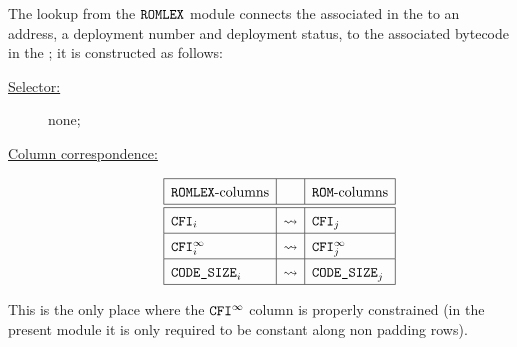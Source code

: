 The lookup from the $\texttt{ROMLEX}$ module connects the \CFI{} associated in the \romLexMod{} to an address, a deployment number and deployment status, to the associated bytecode in the \romMod{}; it is constructed as follows:
\begin{description}
	\item[\underline{Selector:}] none;
	\item[\underline{Column correspondence:}]
		\[
			\renewcommand{\arraystretch}{1.5}
			\begin{array}{|l|c|l|}
				\hline
				\text{\romLexMod{}-columns} &                  & \text{\romMod{}-columns} \\ \hline\hline
				\cfi      _{i}              & \rightsquigarrow & \cfi      _{j}           \\ \hline
				\cfiMax   _{i}              & \rightsquigarrow & \cfiMax   _{j}           \\ \hline
				\codeSize _{i}              & \rightsquigarrow & \codeSize _{j}           \\ \hline
			\end{array}
		\]
\end{description}
\saNote{} This is the only place where the $\texttt{CFI}^\infty{}$ column is properly constrained
(in the present module it is only required to be constant along non padding rows). 
